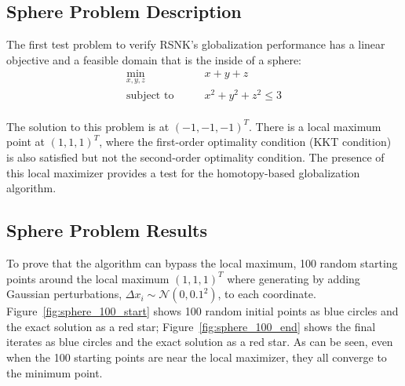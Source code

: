 \subsection{Sphere Problem Description}
The first test problem to verify RSNK's globalization performance has a linear objective and a feasible domain that is the inside of a sphere:
\begin{equation*}
\begin{aligned}
\underset{x, y, z} {\text{min}}  & \quad \quad x + y + z \\
   {\text{subject to}}  & \quad \quad x^2 + y^2 + z^2 \leq 3 \\
\end{aligned}
\end{equation*}

The solution to this problem is at $(-1,-1,-1)^T$. There is a local maximum point at $(1,1,1)^T$, where the 
first-order optimality condition (KKT condition) is also satisfied but not the second-order optimality condition. 
The presence of this local maximizer provides a test for the homotopy-based globalization algorithm.

\subsection{Sphere Problem Results}
To prove that the algorithm can bypass the local maximum, 100 random starting points around the local maximum $(1,1,1)^T$ where generating by adding Gaussian perturbations, $\Delta x_i \sim \mathcal{N}(0,0.1^2)$, to each coordinate. Figure~\ref{fig:sphere_100_start} shows 100 random initial points as blue circles and the exact solution as a red star; Figure~\ref{fig:sphere_100_end} shows the final iterates as blue circles and the exact solution as a red star. As can be seen, even when the 100 starting points are near the local maximizer, they all converge to the minimum point.  

